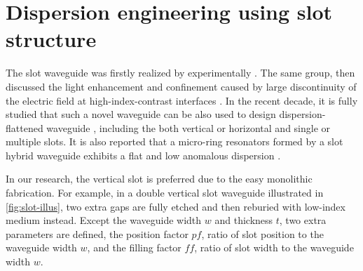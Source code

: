 
\begin{figure}
	\centering
	
	\label{fig:wg-disp}
\end{figure}

\section[{Dispersion engineering using slot structure}]{Dispersion engineering using slot structure}

The slot waveguide was firstly realized by \citeauthor{Xu2004} experimentally \cite{Xu2004}. The same group, \citeauthor{Almeida2004} then discussed the light enhancement and confinement caused by large discontinuity of the electric field at high-index-contrast interfaces \cite{Almeida2004}. In the recent decade, it is fully studied that such a novel waveguide can be also used to design dispersion-flattened waveguide \cites{Mas2010, Zhang2010, Zhu2012, Nolte2013}, including the both vertical or horizontal and single or multiple slots. It is also reported that a micro-ring resonators formed by a slot hybrid waveguide 
exhibits a flat and low anomalous dispersion \cite{Zhang2013}.

In our research, the vertical slot is preferred due to the easy monolithic fabrication. 
For example, in a double vertical slot waveguide illustrated in \autoref{fig:slot-illus}, two extra gaps are fully etched and then reburied with low-index medium instead. 
Except the waveguide width $w$ and thickness $t$, two extra parameters are defined, 
the position factor $ \mathit{pf} $, ratio of slot position to the waveguide width $w$, and the filling factor $ \mathit{ff} $, ratio of slot width to the waveguide width $ w $.



\begin{figure}
		\centering	
		
		\label{fig:slot-illus}
\end{figure}


